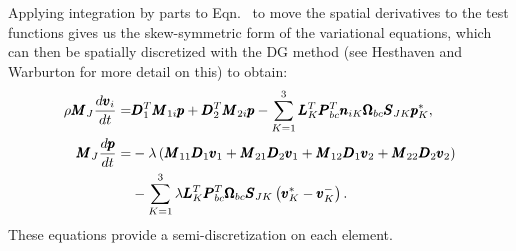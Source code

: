 Applying integration by parts to Eqn.~ to move the spatial derivatives to
the test functions gives us the skew-symmetric form of the variational equations, which
can then be spatially discretized with the DG method (see Hesthaven and Warburton \cite{hesthaven2007nodal} for more
detail on this) to obtain:
\begin{align}
  \rho \pmb{M}_{J} \frac{d \pmb{v}_{i}}{dt} =&
  \pmb{D}_{1}^{T} \pmb{M}_{1i} \pmb{p}
  + \pmb{D}_{2}^{T} \pmb{M}_{2i} \pmb{p}
  - \sum_{K=1}^{3} \pmb{L}_{K}^{T} \pmb{P}_{bc}^{T} \pmb{n}_{iK}
  \pmb{\Omega}_{bc} \pmb{S}_{JK} \pmb{p}_{K}^{*},\\
  \notag
  \pmb{M}_{J} \frac{d\pmb{p}}{dt} =&
  -\lambda\left(
  \pmb{M}_{11} \pmb{D}_{1} \pmb{v}_{1}
    +
    \pmb{M}_{21} \pmb{D}_{2} \pmb{v}_{1}
    +
    \pmb{M}_{12} \pmb{D}_{1} \pmb{v}_{2}
    +
    \pmb{M}_{22} \pmb{D}_{2} \pmb{v}_{2}
  \right)\\
  &- \sum_{K=1}^{3}\lambda \pmb{L}_{K}^{T} \pmb{P}_{bc}^{T} \pmb{\Omega}_{bc}
  \pmb{S}_{JK} \left(\pmb{v}_{K}^* - \pmb{v}_{K}^{-}\right).
\end{align}
These equations provide a semi-discretization on each element.
